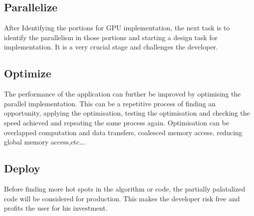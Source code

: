 \subsection{Parallelize}
After Identifying the portions for GPU implementation, the next task is to identify the parallelism in those portions and starting a design task for implementation. It is a very crucial stage and challenges the developer.
\subsection{Optimize}
The performance of the application can further be improved by optimising the parallel implementation. This can be a repetitive process of finding an opportunity, applying the optimisation, testing the optimisation and checking the speed achieved and repeating the same process again. Optimisation can be overlapped computation and data transfers, coalesced memory access, reducing global memory access,etc\ldots .
\subsection{Deploy}
Before finding more hot spots in the algorithm or code, the partially palatalized code will be considered for production. This makes the developer risk free and profits the user for his investment.
